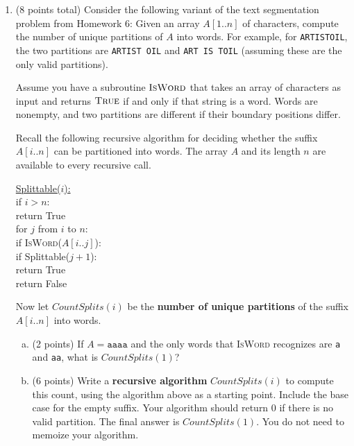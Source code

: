 \documentclass[11pt]{article}
\begin{document}
\begin{enumerate}
\begin{enumerate}[(a)]
\begin{algo}
MemoizedWut($H[1..n]$):\+\\
Let $M[1..n]$ be a new array\\
\# initialize the base cases\\[.8in]
\# fill the rest of the array\\[1.3in]
\# return the final answer\\[.55in]
\hspace{5in}
\end{algo}
\end{enumerate}
\newpage
\item (8 points total) Consider the following variant of the text segmentation problem from Homework 6: Given an array $A[1..n]$ of characters, compute the number of unique partitions of $A$ into words. For example, for \texttt{ARTISTOIL}, the two partitions are \texttt{ARTIST OIL} and \texttt{ART IS TOIL} (assuming these are the only valid partitions).

Assume you have a subroutine $\textsc{IsWord}$ that takes an array of characters as input and returns $\textsc{True}$ if and only if that string is a word. Words are nonempty, and two partitions are different if their boundary positions differ.

Recall the following recursive algorithm for deciding whether the suffix $A[i..n]$ can be partitioned into words. The array $A$ and its length $n$ are available to every recursive call.
\begin{algo}
\underline{Splittable($i$):}\+\\
if $i>n$:\+\\
return True\-\\
for $j$ from $i$ to $n$:\+\\
if \textsc{IsWord}($A[i..j]$):\+\\
if Splittable($j+1$):\+\\
return True\-\-\-\\
return False
\end{algo}
Now let $CountSplits(i)$ be the \textbf{number of unique partitions} of the suffix $A[i..n]$ into words.
\begin{enumerate}[(a)]
\item (2 points) If $A=\texttt{aaaa}$ and the only words that \textsc{IsWord} recognizes are \texttt{a} and \texttt{aa}, what is $CountSplits(1)$?
\vspace{.45in}
\item (6 points) Write a \textbf{recursive algorithm} $CountSplits(i)$ to compute this count, using the algorithm above as a starting point. Include the base case for the empty suffix. Your algorithm should return 0 if there is no valid partition. The final answer is $CountSplits(1)$. You do not need to memoize your algorithm.
\vfill
\end{enumerate}
\end{enumerate}
\end{document}
